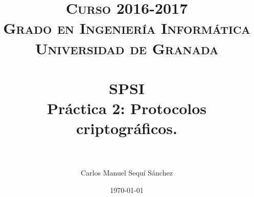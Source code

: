 
\usepackage{listings}


\title{	
	\normalfont \normalsize 
	\textsc{\textbf{Curso 2016-2017} \\ Grado en Ingeniería Informática \\ Universidad de Granada} \\ [25pt] %
	\horrule{0.5pt} \\[0.4cm] %
	\huge SPSI \\ Práctica 2: Protocolos criptográficos. \\ %
	\horrule{2pt} \\[0.5cm] %
}

\author{Carlos Manuel Sequí Sánchez} %

\date{\normalsize\today} %



	
	\maketitle %
	
	\newpage %
	
	\tableofcontents %
	
	\listoffigures
	
	\newpage
	
	
	






